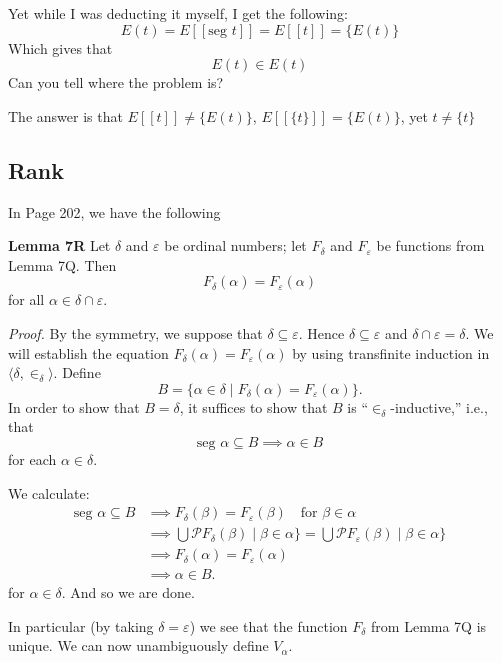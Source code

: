     Yet while I was deducting it myself, I get the following:
        \[
        E(t) = E[\![\text{seg } t]\!] = E[\![t]\!] = \{E(t)\}
        \]
    Which gives that 
        \[
            E(t) \in E(t)
        \]
    Can you tell where the problem is?

    The answer is that \(E[\![t]\!] \neq \{E(t)\}\), \(E[\![\{t\}]\!] = \{E(t)\}\), yet \(t \neq \{t\}\)

    \subsection{Rank}
    In Page 202, we have the following

    \begin{leftbar}
        \noindent
    \textbf{Lemma 7R} Let \( \delta \) and \( \varepsilon \) be ordinal numbers; let \( F_\delta \) and \( F_\varepsilon \) be functions from Lemma 7Q. Then
    \[
    F_\delta(\alpha) = F_\varepsilon(\alpha)
    \]
    for all \( \alpha \in \delta \cap \varepsilon \).

    \medskip
    \noindent
    \textit{Proof.} By the symmetry, we suppose that \( \delta \subseteq \varepsilon \). Hence \( \delta \subseteq \varepsilon \) and \( \delta \cap \varepsilon = \delta \). We will establish the equation \( F_\delta(\alpha) = F_\varepsilon(\alpha) \) by using transfinite induction in \( \langle \delta, \in_\delta \rangle \). Define
    \[
    B = \{\alpha \in \delta \mid F_\delta(\alpha) = F_\varepsilon(\alpha)\}.
    \]
    In order to show that \( B = \delta \), it suffices to show that \( B \) is ``\(\in_\delta\)-inductive,'' i.e., that
    \[
    \text{seg } \alpha \subseteq B \implies \alpha \in B
    \]
    for each \( \alpha \in \delta \).

    \noindent
    We calculate:
    \[
    \begin{aligned}
    \text{seg } \alpha \subseteq B &\implies F_\delta(\beta) = F_\varepsilon(\beta) \quad \text{for } \beta \in \alpha \\
    &\implies \bigcup \mathscr{P} F_\delta(\beta) \mid \beta \in \alpha \} = \bigcup \mathscr{P} F_\varepsilon(\beta) \mid \beta \in \alpha \} \\
    &\implies F_\delta(\alpha) = F_\varepsilon(\alpha) \\
    &\implies \alpha \in B.
    \end{aligned}
    \]
    for \( \alpha \in \delta \). And so we are done.

    \medskip
    \noindent
    In particular (by taking \( \delta = \varepsilon \)) we see that the function \( F_\delta \) from Lemma 7Q is unique. We can now unambiguously define \( V_\alpha \).


\end{leftbar}
